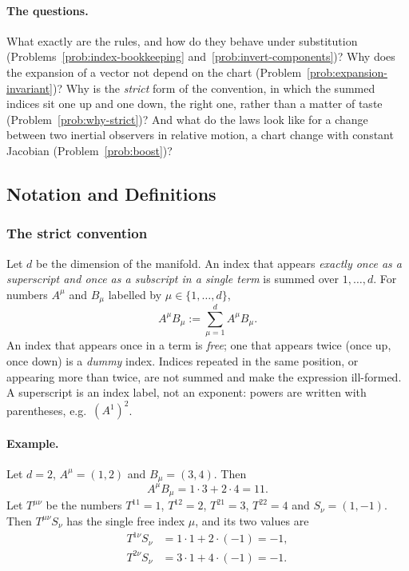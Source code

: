 \documentclass[11pt]{article}
\begin{document}
\paragraph{The questions.}
What exactly are the rules, and how do they behave under substitution (Problems~\ref{prob:index-bookkeeping} and~\ref{prob:invert-components})? Why does the expansion of a vector not depend on the chart (Problem~\ref{prob:expansion-invariant})? Why is the \emph{strict} form of the convention, in which the summed indices sit one up and one down, the right one, rather than a matter of taste (Problem~\ref{prob:why-strict})? And what do the laws look like for a change between two inertial observers in relative motion, a chart change with constant Jacobian (Problem~\ref{prob:boost})?

\subsection*{Notation and Definitions}

\subsubsection*{The strict convention}
Let $d$ be the dimension of the manifold. An index that appears \emph{exactly once as a superscript and once as a subscript in a single term} is summed over $1,\dots,d$. For numbers $A^\mu$ and $B_\mu$ labelled by $\mu\in\{1,\dots,d\}$,
\[
A^\mu B_\mu:=\sum_{\mu=1}^dA^\mu B_\mu.
\]
An index that appears once in a term is \emph{free}; one that appears twice (once up, once down) is a \emph{dummy} index. Indices repeated in the same position, or appearing more than twice, are not summed and make the expression ill-formed. A superscript is an index label, not an exponent: powers are written with parentheses, e.g.\ $(A^1)^2$.

\paragraph{Example.} Let $d=2$, $A^\mu=(1,2)$ and $B_\mu=(3,4)$. Then
\[
A^\mu B_\mu=1\cdot3+2\cdot4=11.
\]
Let $T^{\mu\nu}$ be the numbers $T^{11}=1$, $T^{12}=2$, $T^{21}=3$, $T^{22}=4$ and $S_\nu=(1,-1)$. Then $T^{\mu\nu}S_\nu$ has the single free index $\mu$, and its two values are
\begin{align*}
T^{1\nu}S_\nu&=1\cdot1+2\cdot(-1)=-1,\\
T^{2\nu}S_\nu&=3\cdot1+4\cdot(-1)=-1.
\end{align*}
\end{document}
